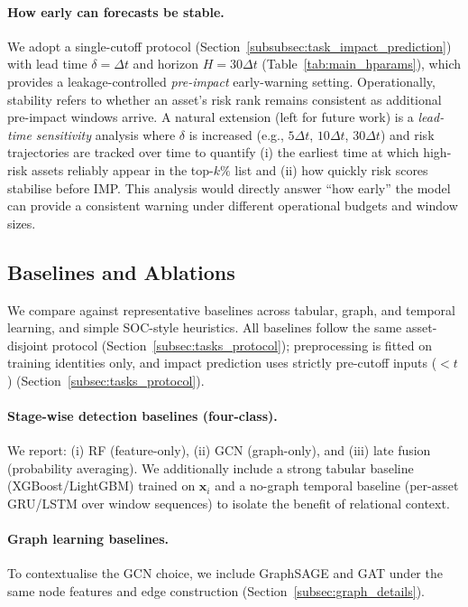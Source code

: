 \documentclass[pdflatex,sn-mathphys-num]{sn-jnl}
\theoremstyle{thmstyleone}%
\theoremstyle{thmstyletwo}%
\theoremstyle{thmstylethree}%
\begin{document}
\paragraph{How early can forecasts be stable.}
We adopt a single-cutoff protocol (Section~\ref{subsubsec:task_impact_prediction}) with lead time $\delta=\Delta t$ and horizon $H=30\Delta t$ (Table~\ref{tab:main_hparams}), which provides a leakage-controlled \emph{pre-impact} early-warning setting.
Operationally, stability refers to whether an asset's risk rank remains consistent as additional pre-impact windows arrive.
A natural extension (left for future work) is a \emph{lead-time sensitivity} analysis where $\delta$ is increased (e.g., $5\Delta t$, $10\Delta t$, $30\Delta t$) and risk trajectories are tracked over time to quantify (i) the earliest time at which high-risk assets reliably appear in the top-$k\%$ list and (ii) how quickly risk scores stabilise before IMP.
This analysis would directly answer ``how early'' the model can provide a consistent warning under different operational budgets and window sizes.


\subsection{Baselines and Ablations}
\label{subsec:baselines}
We compare against representative baselines across tabular, graph, and temporal learning, and simple SOC-style heuristics. All baselines follow the same asset-disjoint protocol (Section~\ref{subsec:tasks_protocol}); preprocessing is fitted on training identities only, and impact prediction uses strictly pre-cutoff inputs ($<t$) (Section~\ref{subsec:tasks_protocol}).

\paragraph{Stage-wise detection baselines (four-class).}
We report: (i) RF (feature-only), (ii) GCN (graph-only), and (iii) late fusion (probability averaging). 
We additionally include a strong tabular baseline (XGBoost/LightGBM) trained on $\mathbf{x}_i$ and a no-graph temporal baseline (per-asset GRU/LSTM over window sequences) to isolate the benefit of relational context.

\paragraph{Graph learning baselines.}
To contextualise the GCN choice, we include GraphSAGE and GAT under the same node features and edge construction (Section~\ref{subsec:graph_details}).
\end{document}
